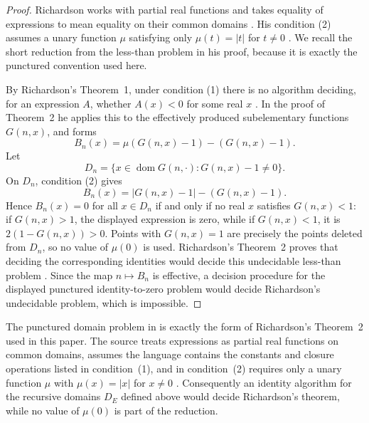 \begin{proof}
Richardson works with partial real functions and takes equality of expressions to
mean equality on their common domains \cite[p.~514]{Richardson1968}.  His
condition (2) assumes a unary function \(\mu\) satisfying only
\(\mu(t)=|t|\) for \(t\ne0\) \cite[p.~514]{Richardson1968}.  We recall the short
reduction from the less-than problem in his proof, because it is exactly the
punctured convention used here.

By Richardson's Theorem~1, under condition (1) there is no algorithm deciding,
for an expression \(A\), whether \(A(x)<0\) for some real \(x\)
\cite[p.~520, Theorem~1]{Richardson1968}.  In the proof of Theorem~2 he applies
this to the effectively produced subelementary functions \(G(n,x)\), and forms
\[
  B_n(x)=\mu(G(n,x)-1)-(G(n,x)-1).
\]
Let
\[
  D_n=\{x\in\operatorname{dom}G(n,\cdot):G(n,x)-1\ne0\}.
\]
On \(D_n\), condition (2) gives
\[
  B_n(x)=|G(n,x)-1|-(G(n,x)-1).
\]
Hence \(B_n(x)=0\) for all \(x\in D_n\) if and only if no real \(x\) satisfies
\(G(n,x)<1\): if \(G(n,x)>1\), the displayed expression is zero, while if
\(G(n,x)<1\), it is \(2(1-G(n,x))>0\).  Points with \(G(n,x)=1\) are precisely
the points deleted from \(D_n\), so no value of \(\mu(0)\) is used.  Richardson's
Theorem~2 proves that deciding the corresponding identities would decide this
undecidable less-than problem \cite[p.~520, Theorem~2]{Richardson1968}.  Since the
map \(n\mapsto B_n\) is effective, a decision procedure for the displayed
punctured identity-to-zero problem would decide Richardson's undecidable problem,
which is impossible.
\end{proof}

\begin{proposition}
\label{prop:stable-richardson-source-check}
The punctured domain problem in
 is exactly the form of
Richardson's Theorem~2 used in this paper.  The source treats expressions as
partial real functions on common domains, assumes the language contains the
constants and closure operations listed in condition~(1), and in condition~(2)
requires only a unary function \(\mu\) with
\(\mu(x)=|x|\) for \(x\ne0\) \cite[pp.~514, 520, Theorem~2]{Richardson1968}.
Consequently an identity algorithm for the recursive domains \(D_E\) defined
above would decide Richardson's theorem, while no value of \(\mu(0)\) is part of
the reduction.
\end{proposition}

